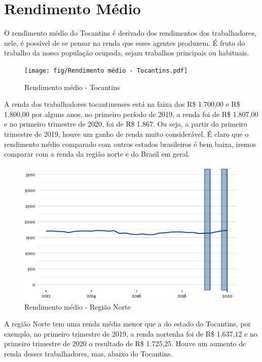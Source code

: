 \section{Rendimento Médio}

\par O rendimento médio do Tocantins é derivado dos rendimentos dos trabalhadores, nele, é possível de se pensar na renda que esses agentes produzem. É fruto do trabalho da nossa população ocupada, sejam trabalhos principais ou habituais. 

\begin{figure}[h]
	\caption{Rendimento médio - Tocantins}
	\texttt{[image: fig/Rendimento médio - Tocantins.pdf]}
\end{figure}

\par A renda dos trabalhadores tocantinenses está na faixa dos R\$ 1.700,00 e R\$ 1.800,00 por alguns anos, no primeiro período de 2019, a renda foi de R\$ 1.807,00 e no primeiro trimestre de 2020, foi de R\$ 1.867. Ou seja, a partir do primeiro trimestre de 2019, houve um ganho de renda muito considerável. É claro que o rendimento médio comparado com outros estados brasileiros é bem baixa, iremos comparar com a renda da região norte e do Brasil em geral.

\begin{figure}[h]
	\caption{Rendimento médio - Região Norte}
	\includegraphics[width=\linewidth]{fig/Rendimento médio - Região Norte.pdf}
\end{figure}

\par A região Norte tem uma renda média menor que a do estado do Tocantins, por exemplo, no primeiro trimestre de 2019, a renda nortenha foi de R\$ 1.637,12 e no primeiro trimestre de 2020 o resultado de R\$ 1.725,25. Houve um aumento de renda desses trabalhadores, mas, abaixo do Tocantins.

